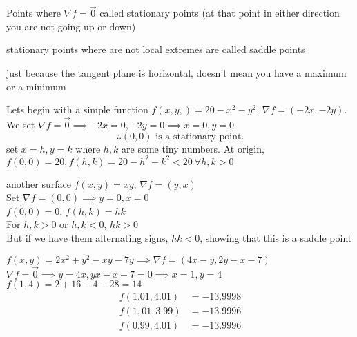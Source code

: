 \begin{itemize}
\begin{definition}
		\end{definition}
		\begin{definition}
			Points where $\nabla f = \vec{0}$ called stationary points (at that point in either direction you are not going up or down)
		\end{definition}
		\begin{definition}
			stationary points where are not local extremes are called saddle points
		\end{definition}
		\begin{idea}
			just because the tangent plane is horizontal, doesn't mean you have a maximum or a minimum
		\end{idea}
		\begin{example}
		Lets begin with a simple function $f\left( x,y, \right)  = 20 - x^2 - y^2$, $\nabla f = \left( -2x, -2y \right)$.\\
		We set $\nabla f = \vec{0} \implies -2x = 0, -2y = 0 \implies x = 0, y = 0$ 
		\begin{equation}
			\therefore (0,0) \text{ is a stationary point.}
		\end{equation}
		set $x = h, y = k$ where $h,k$ are some tiny numbers. At origin, $f\left( 0,0 \right)  = 20, f\left( h,k \right) = 20-h^2-k^2 < 20~ \forall h,k>0$
		\end{example}
		\begin{example}
			another surface $f\left( x,y \right)  = xy$, $\nabla f = \left( y,x \right) $ \\
			Set $\nabla f = \left( 0,0 \right)  \implies y = 0, x = 0$ \\
			$f\left( 0,0 \right)  = 0$, $f\left( h,k \right)  = hk$ \\
			For $h,k > 0$ or $h,k < 0$, $hk>0$ \\
			But if we have them alternating signs, $hk < 0$, showing that this is a saddle point
		\end{example}
		\begin{example}
			$f\left( x,y \right)  = 2x^2 + y^2 - xy - 7y\implies\nabla f = \left( 4x-y, 2y-x-7 \right) $\\
			$\nabla f = \vec{0} \implies y = 4x, yx-x-7 = 0 \implies x = 1, y = 4$\\
			$f\left( 1,4 \right)  = 2 + 16 - 4 - 28 = 14$
			\begin{align*}
				f\left( 1.01, 4.01 \right)  &= -13.9998\\
				f\left( 1,01,3.99 \right)  &=  -13.9996 \\
				f\left( 0.99, 4.01 \right) &= -13.9996\\

\end{align*}
\end{example}
\end{itemize}
